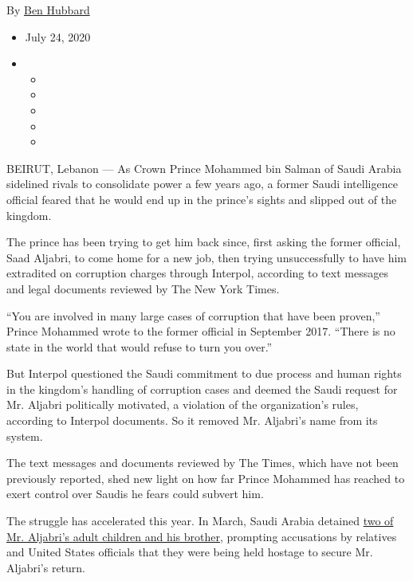 By \href{https://www.nytimes3xbfgragh.onion/by/ben-hubbard}{Ben Hubbard}

\begin{itemize}
\item
  July 24, 2020
\item
  \begin{itemize}
  \item
  \item
  \item
  \item
  \item
  \end{itemize}
\end{itemize}

BEIRUT, Lebanon --- As Crown Prince Mohammed bin Salman of Saudi Arabia
sidelined rivals to consolidate power a few years ago, a former Saudi
intelligence official feared that he would end up in the prince's sights
and slipped out of the kingdom.

The prince has been trying to get him back since, first asking the
former official, Saad Aljabri, to come home for a new job, then trying
unsuccessfully to have him extradited on corruption charges through
Interpol, according to text messages and legal documents reviewed by The
New York Times.

``You are involved in many large cases of corruption that have been
proven,'' Prince Mohammed wrote to the former official in September
2017. ``There is no state in the world that would refuse to turn you
over.''

But Interpol questioned the Saudi commitment to due process and human
rights in the kingdom's handling of corruption cases and deemed the
Saudi request for Mr. Aljabri politically motivated, a violation of the
organization's rules, according to Interpol documents. So it removed Mr.
Aljabri's name from its system.

The text messages and documents reviewed by The Times, which have not
been previously reported, shed new light on how far Prince Mohammed has
reached to exert control over Saudis he fears could subvert him.

The struggle has accelerated this year. In March, Saudi Arabia detained
\href{https://www.nytimes3xbfgragh.onion/2020/05/21/world/middleeast/saudi-aljabri-detain.html}{two
of Mr. Aljabri's adult children and his brother}, prompting accusations
by relatives and United States officials that they were being held
hostage to secure Mr. Aljabri's return.

